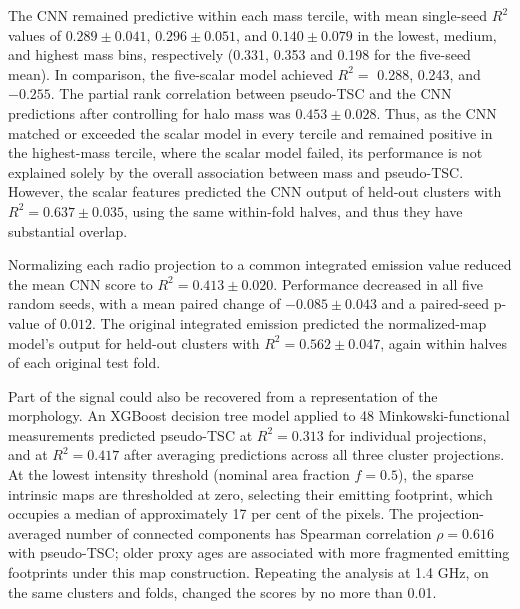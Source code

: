 The CNN remained predictive within each mass tercile, with mean single-seed $R^2$ values of $0.289 \pm 0.041$, $0.296 \pm 0.051$, and $0.140 \pm 0.079$ in the lowest, medium, and highest mass bins, respectively (0.331, 0.353 and 0.198 for the five-seed mean).
In comparison, the five-scalar model achieved $R^2=$ 0.288, 0.243, and $-0.255$.
The partial rank correlation between pseudo-TSC and the CNN predictions after controlling for halo mass was $0.453 \pm 0.028$.
Thus, as the CNN matched or exceeded the scalar model in every tercile and remained positive in the highest-mass tercile, where the scalar model failed, its performance is not explained solely by the overall association between mass and pseudo-TSC.
However, the scalar features predicted the CNN output of held-out clusters with $R^2 = 0.637 \pm 0.035$, using the same within-fold halves, and thus they have substantial overlap.

Normalizing each radio projection to a common integrated emission value reduced the mean CNN score to $R^2=0.413 \pm 0.020$.
Performance decreased in all five random seeds, with a mean paired change of $-0.085\pm0.043$ and a paired-seed p-value of $0.012$.
The original integrated emission predicted the normalized-map model's output for held-out clusters with $R^2 = 0.562 \pm 0.047$, again within halves of each original test fold.

Part of the signal could also be recovered from a representation of the morphology.
An XGBoost decision tree model applied to 48 Minkowski-functional measurements predicted pseudo-TSC at $R^2 = 0.313$ for individual projections, and at $R^2 = 0.417$ after averaging predictions across all three cluster projections.
At the lowest intensity threshold (nominal area fraction $f=0.5$), the sparse intrinsic maps are thresholded at zero, selecting their emitting footprint, which occupies a median of approximately 17 per cent of the pixels.
The projection-averaged number of connected components has Spearman correlation $\rho=0.616$ with pseudo-TSC; older proxy ages are associated with more fragmented emitting footprints under this map construction.
Repeating the analysis at 1.4 GHz, on the same clusters and folds, changed the scores by no more than 0.01.

